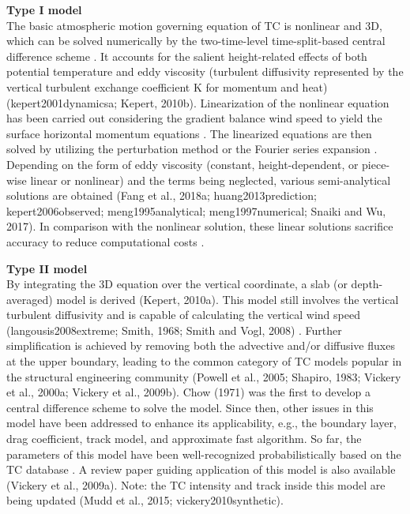 \noindent\textbf{Type I model} \\The basic atmospheric motion governing equation of TC is nonlinear and 3D, which can be solved numerically by the two-time-level time-split-based central difference scheme \citep{kepert2001dynamicsa,kepert2011choosing}. It accounts for the salient height-related effects of both potential temperature and eddy viscosity (turbulent diffusivity represented by the vertical turbulent exchange coefficient K for momentum and heat) (kepert2001dynamicsa; Kepert, 2010b). Linearization of the nonlinear equation has been carried out considering the gradient balance wind speed to yield the surface horizontal momentum equations \citep{kepert2001dynamics}. The linearized equations are then solved by utilizing the perturbation method \citep{meng1995analytical} or the Fourier series expansion \citep{kepert2001dynamics}. Depending on the form of eddy viscosity (constant, height-dependent, or piece-wise linear or nonlinear) and the terms being neglected, various semi-analytical solutions are obtained (Fang et al., 2018a; huang2013prediction; kepert2006observed; meng1995analytical; meng1997numerical; Snaiki and Wu, 2017). In comparison with the nonlinear solution, these linear solutions sacrifice accuracy to reduce computational costs \citep{kepert2014reply}. 
\newline

\noindent\textbf{Type II model} \\By integrating the 3D equation over the vertical coordinate, a slab (or depth-averaged) model is derived (Kepert, 2010a). This model still involves the vertical turbulent diffusivity and is capable of calculating the vertical wind speed (langousis2008extreme; Smith, 1968; Smith and Vogl, 2008) . Further simplification is achieved by removing both the advective and/or diffusive fluxes at the upper boundary, leading to the common category of TC models popular in the structural engineering community (Powell et al., 2005; Shapiro, 1983; Vickery et al., 2000a; Vickery et al., 2009b). Chow (1971) was the first to develop a central difference scheme to solve the model. Since then, other issues in this model have been addressed to enhance its applicability, e.g., the boundary layer, drag coefficient, track model, and approximate fast algorithm. So far, the parameters of this model have been well-recognized probabilistically based on the TC database \citep{vickery2008statistical}. A review paper guiding application of this model is also available (Vickery et al., 2009a). Note: the TC intensity and track inside this model are being updated (Mudd et al., 2015; vickery2010synthetic). 
\newline

